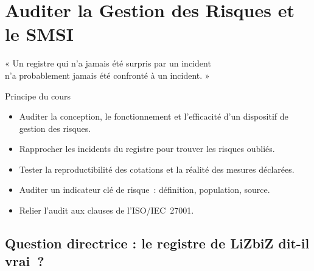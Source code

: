 
\chapter{Auditer la Gestion des Risques et le SMSI}
\label{chap:auditer-risques}

\epigraph{%
    « Un registre qui n'a jamais été surpris par un incident\\
    n'a probablement jamais été confronté à un incident. »%
}{Principe du cours}


\begin{boxobjectifs}
\begin{itemize}
    \item Auditer la conception, le fonctionnement et l'efficacité d'un
          dispositif de gestion des risques.
    \item Rapprocher les incidents du registre pour trouver les risques
          oubliés.
    \item Tester la reproductibilité des cotations et la réalité des
          mesures déclarées.
    \item Auditer un indicateur clé de risque~: définition, population,
          source.
    \item Relier l'audit aux clauses de l'ISO/IEC~27001.
\end{itemize}
\end{boxobjectifs}

\bigskip

\section*{Question directrice : le registre de LiZbiZ dit-il vrai~?}

